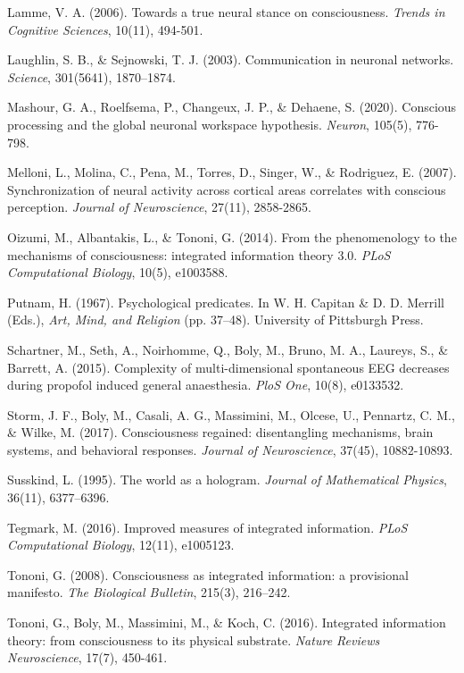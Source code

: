 \documentclass[12pt]{article}
\begin{document}
\begin{thebibliography}{99}
     Lamme, V. A. (2006). Towards a true neural stance on consciousness. \emph{Trends in Cognitive Sciences}, 10(11), 494-501.
    
     Laughlin, S. B., \& Sejnowski, T. J. (2003). Communication in neuronal networks. \emph{Science}, 301(5641), 1870–1874.
    
     Mashour, G. A., Roelfsema, P., Changeux, J. P., \& Dehaene, S. (2020). Conscious processing and the global neuronal workspace hypothesis. \emph{Neuron}, 105(5), 776-798.
    
     Melloni, L., Molina, C., Pena, M., Torres, D., Singer, W., \& Rodriguez, E. (2007). Synchronization of neural activity across cortical areas correlates with conscious perception. \emph{Journal of Neuroscience}, 27(11), 2858-2865.
    
     Oizumi, M., Albantakis, L., \& Tononi, G. (2014). From the phenomenology to the mechanisms of consciousness: integrated information theory 3.0. \emph{PLoS Computational Biology}, 10(5), e1003588.
    
     Putnam, H. (1967). Psychological predicates. In W. H. Capitan \& D. D. Merrill (Eds.), \emph{Art, Mind, and Religion} (pp. 37–48). University of Pittsburgh Press.
    
     Schartner, M., Seth, A., Noirhomme, Q., Boly, M., Bruno, M. A., Laureys, S., \& Barrett, A. (2015). Complexity of multi-dimensional spontaneous EEG decreases during propofol induced general anaesthesia. \emph{PloS One}, 10(8), e0133532.
    
     Storm, J. F., Boly, M., Casali, A. G., Massimini, M., Olcese, U., Pennartz, C. M., \& Wilke, M. (2017). Consciousness regained: disentangling mechanisms, brain systems, and behavioral responses. \emph{Journal of Neuroscience}, 37(45), 10882-10893.
    
     Susskind, L. (1995). The world as a hologram. \emph{Journal of Mathematical Physics}, 36(11), 6377–6396.
    
     Tegmark, M. (2016). Improved measures of integrated information. \emph{PLoS Computational Biology}, 12(11), e1005123.
    
     Tononi, G. (2008). Consciousness as integrated information: a provisional manifesto. \emph{The Biological Bulletin}, 215(3), 216–242.
    
     Tononi, G., Boly, M., Massimini, M., \& Koch, C. (2016). Integrated information theory: from consciousness to its physical substrate. \emph{Nature Reviews Neuroscience}, 17(7), 450-461.
\end{thebibliography}
\end{document}
